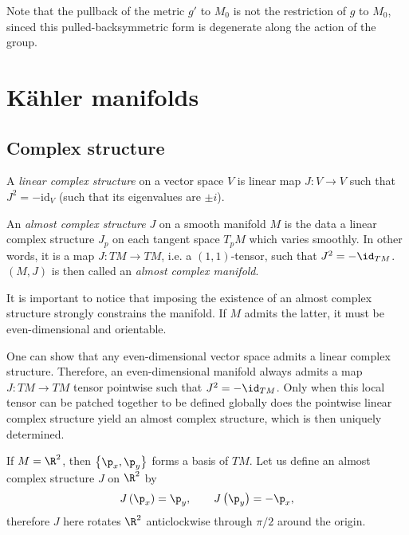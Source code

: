 \documentclass{worksheetclass}
\begin{document}
    Note that the pullback of the metric $g'$ to $M_0$ is not the restriction of $g$ to $M_0$, sinced this pulled-backsymmetric form is degenerate along the action of the group.

\section{Kähler manifolds}

    \subsection{Complex structure}

        \begin{defn}
            A \emph{linear complex structure} on a vector space $V$ is linear map $J:V\to V$ such that $J^2=-\text{id}_V$ (such that its eigenvalues are $\pm i$).
        \end{defn}
        
        \begin{defn}
            An \emph{almost complex structure} $J$ on a smooth manifold $M$ is the data a linear complex structure $J_p$ on each tangent space $T_pM$ which varies smoothly. In other words, it is a map $J:TM\to TM$, i.e. a $(1,1)$-tensor, such that $J^2=-\id_{TM}$. $(M,J)$ is then called an \emph{almost complex manifold}.
        \end{defn}
        
        It is important to notice that imposing the existence of an almost complex structure strongly constrains the manifold. If $M$ admits the latter, it must be even-dimensional and orientable.

        One can show that any even-dimensional vector space admits a linear complex structure. Therefore, an even-dimensional manifold always admits a map $J:TM\to TM$ tensor pointwise such that $J^2=-\id_{TM}$. Only when this local tensor can be patched together to be defined globally does the pointwise linear complex structure yield an almost complex structure, which is then uniquely determined.

        \begin{examp}
            If $M=\R^2$, then $\left\{\p_x,\p_y\right\}$ forms a basis of $TM$. Let us define an almost complex structure $J$ on $\R^2$ by
            \begin{equation}
                J\left( \p_x \right)=\p_{y},\qquad J\left( \p_{y} \right)=-\p_{x},
            \end{equation}
            therefore $J$ here rotates $\R^2$ anticlockwise through $\pi/2$ around the origin.
        \end{examp}
\end{document}
